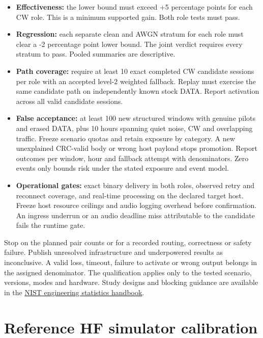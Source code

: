 \documentclass[11pt,a4paper]{article}
\begin{document}
\begin{itemize}
\item \textbf{Effectiveness:} the lower bound must exceed +5 percentage points for each CW role. This is a minimum supported gain. Both role tests must pass.
\item \textbf{Regression:} each separate clean and AWGN stratum for each role must clear a -2 percentage point lower bound. The joint verdict requires every stratum to pass. Pooled summaries are descriptive.
\item \textbf{Path coverage:} require at least 10 exact completed CW candidate sessions per role with an accepted level-2 weighted fallback. Replay must exercise the same candidate path on independently known stock DATA. Report activation across all valid candidate sessions.
\item \textbf{False acceptance:} at least 100 new structured windows with genuine pilots and erased DATA, plus 10 hours spanning quiet noise, CW and overlapping traffic. Freeze scenario quotas and retain exposure by category. A new unexplained CRC-valid body or wrong host payload stops promotion. Report outcomes per window, hour and fallback attempt with denominators. Zero events only bounds risk under the stated exposure and event model.
\item \textbf{Operational gates:} exact binary delivery in both roles, observed retry and reconnect coverage, and real-time processing on the declared target host. Freeze host resource ceilings and audio logging overhead before confirmation. An ingress underrun or an audio deadline miss attributable to the candidate fails the runtime gate.
\end{itemize}
Stop on the planned pair counts or for a recorded routing, correctness or safety failure. Publish unresolved infrastructure and underpowered results as inconclusive. A valid loss, timeout, failure to activate or wrong output belongs in the assigned denominator. The qualification applies only to the tested scenario, versions, modes and hardware. Study designs and blocking guidance are available in the \href{https://www.itl.nist.gov/div898/handbook/pri/section3/pri3.htm}{NIST engineering statistics handbook}.


\section{Reference HF simulator calibration}
\label{md:19}
\end{document}

